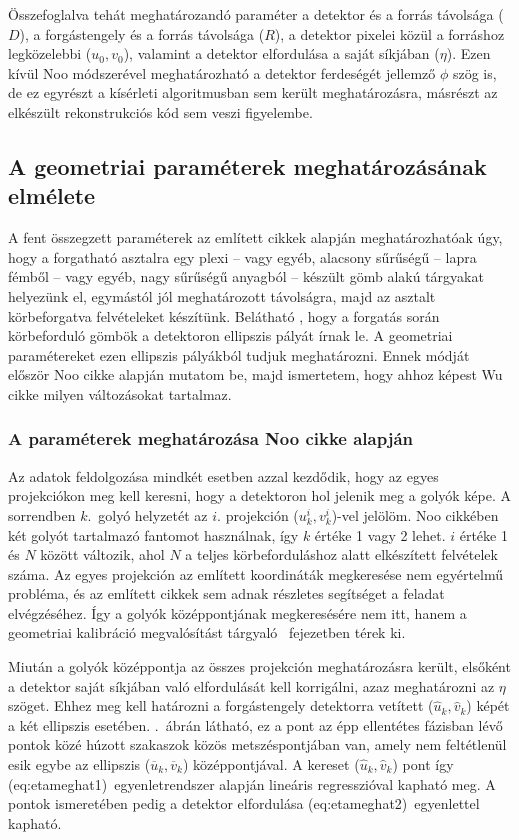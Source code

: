 \documentclass[a4paper,12pt]{article}
\begin{document}
 Összefoglalva tehát meghatározandó paraméter a detektor és a forrás távolsága ($D$), a forgástengely és a forrás távolsága ($R$), a detektor pixelei közül a forráshoz legközelebbi ($u_0,v_0$), valamint a detektor elfordulása a saját síkjában ($\eta$).  Ezen kívül Noo módszerével meghatározható a detektor ferdeségét jellemző $\phi$ szög is, de ez egyrészt a kísérleti algoritmusban sem került meghatározásra, másrészt az elkészült rekonstrukciós kód sem veszi figyelembe.
 

\subsection{A geometriai paraméterek meghatározásának elmélete}

A fent összegzett paraméterek az említett cikkek alapján meghatározhatóak úgy, hogy a forgatható asztalra egy plexi --  vagy egyéb, alacsony sűrűségű -- lapra fémből -- vagy egyéb, nagy sűrűségű anyagból -- készült gömb alakú tárgyakat helyezünk el, egymástól jól meghatározott távolságra, majd az asztalt körbeforgatva felvételeket készítünk. Belátható \cite{noo}, hogy a forgatás során körbeforduló gömbök a detektoron ellipszis pályát írnak le. A geometriai paramétereket ezen ellipszis pályákból tudjuk meghatározni.
Ennek módját először Noo cikke alapján mutatom be, majd ismertetem, hogy ahhoz képest Wu cikke milyen változásokat tartalmaz.

\subsubsection{A paraméterek meghatározása Noo \cite{noo} cikke alapján}
\label{sec:noo}


Az adatok feldolgozása mindkét esetben azzal kezdődik, hogy az egyes projekciókon meg kell keresni, hogy a detektoron hol jelenik meg a golyók képe. A sorrendben $k$.\ golyó helyzetét az $i$. projekción ($u_k^i, v_k^i$)-vel jelölöm. Noo cikkében két golyót tartalmazó fantomot használnak, így $k$ értéke 1 vagy 2 lehet. $i$ értéke 1 és $N$ között változik, ahol $N$ a teljes körbeforduláshoz alatt elkészített felvételek száma.  Az egyes projekción az említett koordináták megkeresése nem egyértelmű probléma, és az említett cikkek sem adnak részletes segítséget  a feladat elvégzéséhez. Így a golyók középpontjának megkeresésére nem itt, hanem a geometriai kalibráció megvalósítást tárgyaló \ fejezetben térek ki. 

Miután a golyók középpontja az összes projekción meghatározásra került, elsőként a detektor saját síkjában való elfordulását kell korrigálni, azaz meghatározni az $\eta$ szöget. Ehhez meg kell határozni a forgástengely detektorra vetített ($\hat{u}_k, \hat{v}_k$) képét a két ellipszis esetében. .~ábrán látható, ez a pont az épp ellentétes fázisban lévő pontok közé húzott szakaszok közös metszéspontjában van, amely nem feltétlenül esik egybe az ellipszis ($\overline{u}_k , \overline{v}_k$) középpontjával. A kereset ($\hat{u}_k, \hat{v}_k$) pont így \aref({eq:etameghat1})~egyenletrendszer alapján lineáris regresszióval kapható meg. A pontok ismeretében pedig a detektor elfordulása \aref({eq:etameghat2})~egyenlettel kapható.
\end{document}
